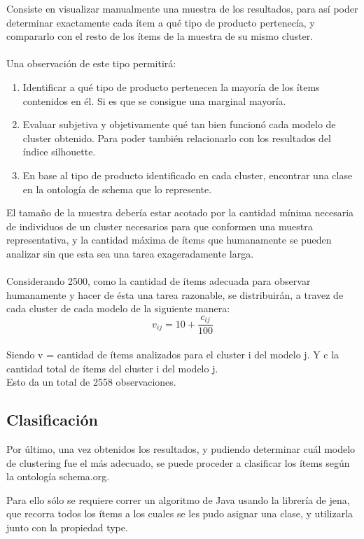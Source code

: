 Consiste en visualizar manualmente una muestra de los resultados, para así poder determinar exactamente cada ítem a qué tipo de producto 
pertenecía, y compararlo con el resto de los ítems de la muestra de su mismo cluster.\\
\\
Una observación de este tipo permitirá:\\
\begin{enumerate}
 \item Identificar a qué tipo de producto pertenecen la mayoría de los ítems contenidos en él. Si es que se consigue una marginal mayoría.\\
 \item Evaluar subjetiva y objetivamente qué tan bien funcionó cada modelo de cluster obtenido. Para poder también relacionarlo con los resultados 
del índice silhouette.
 \item En base al tipo de producto identificado en cada cluster, encontrar una clase en la ontología de schema que lo represente.
\end{enumerate}

El tamaño de la muestra debería estar acotado por la cantidad mínima necesaria de individuos de un cluster necesarios para que conformen 
una muestra representativa, y la cantidad máxima de ítems que humanamente se pueden analizar sin que esta sea una tarea exageradamente larga.\\
\\
Considerando 2500, como la cantidad de ítems adecuada para observar humanamente y hacer de ésta una tarea razonable, se distribuirán, a travez de 
cada cluster de cada modelo de la siguiente manera:\\
$$v_{ij} = 10+\frac{c_{ij}}{100} $$\\
Siendo v = cantidad de ítems analizados para el cluster i del modelo j. Y c la cantidad total de ítems del cluster i del modelo j.\\
Esto da un total de 2558 observaciones.

\subsection{Clasificación}

Por último, una vez obtenidos los resultados, y pudiendo determinar cuál modelo de clustering fue el más adecuado, se puede proceder a 
clasificar los ítems según la ontología schema.org.

Para ello sólo se requiere correr un algoritmo de Java usando la librería de jena, que recorra todos los ítems a los cuales se les pudo 
asignar una clase, y utilizarla junto con la propiedad type.
